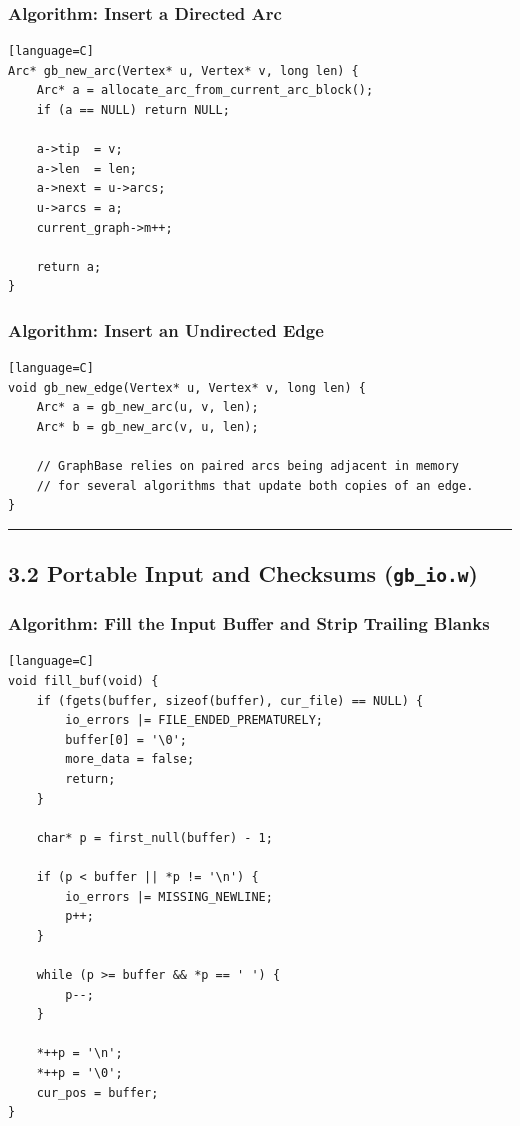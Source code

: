 \documentclass[11pt]{article}
\begin{document}
\subsubsection{Algorithm: Insert a Directed Arc}\label{algorithm-insert-a-directed-arc}

\begin{verbatim}[language=C]
Arc* gb_new_arc(Vertex* u, Vertex* v, long len) {
    Arc* a = allocate_arc_from_current_arc_block();
    if (a == NULL) return NULL;

    a->tip  = v;
    a->len  = len;
    a->next = u->arcs;
    u->arcs = a;
    current_graph->m++;

    return a;
}
\end{verbatim}

\subsubsection{Algorithm: Insert an Undirected Edge}\label{algorithm-insert-an-undirected-edge}

\begin{verbatim}[language=C]
void gb_new_edge(Vertex* u, Vertex* v, long len) {
    Arc* a = gb_new_arc(u, v, len);
    Arc* b = gb_new_arc(v, u, len);

    // GraphBase relies on paired arcs being adjacent in memory
    // for several algorithms that update both copies of an edge.
}
\end{verbatim}

\begin{center}\rule{0.5\linewidth}{0.5pt}\end{center}

\subsection{\texorpdfstring{3.2 Portable Input and Checksums (\texttt{gb\_io.w})}{3.2 Portable Input and Checksums (gb\_io.w)}}\label{portable-input-and-checksums-gb_io.w}

\subsubsection{Algorithm: Fill the Input Buffer and Strip Trailing Blanks}\label{algorithm-fill-the-input-buffer-and-strip-trailing-blanks}

\begin{verbatim}[language=C]
void fill_buf(void) {
    if (fgets(buffer, sizeof(buffer), cur_file) == NULL) {
        io_errors |= FILE_ENDED_PREMATURELY;
        buffer[0] = '\0';
        more_data = false;
        return;
    }

    char* p = first_null(buffer) - 1;

    if (p < buffer || *p != '\n') {
        io_errors |= MISSING_NEWLINE;
        p++;
    }

    while (p >= buffer && *p == ' ') {
        p--;
    }

    *++p = '\n';
    *++p = '\0';
    cur_pos = buffer;
}
\end{verbatim}
\end{document}
